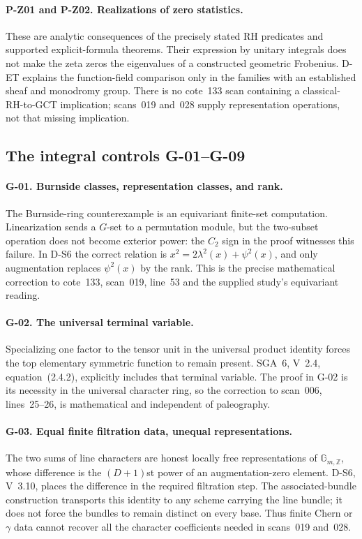 \paragraph{P-Z01 and P-Z02. Realizations of zero statistics.}
These are analytic consequences of the precisely stated RH predicates and supported explicit-formula theorems. Their expression by unitary integrals does not make the zeta zeros the eigenvalues of a constructed geometric Frobenius. D-ET explains the function-field comparison only in the families with an established sheaf and monodromy group. There is no cote~133 scan containing a classical-RH-to-GCT implication; scans~019 and~028 supply representation operations, not that missing implication.

\subsection{The integral controls G-01--G-09}

\paragraph{G-01. Burnside classes, representation classes, and rank.}
The Burnside-ring counterexample is an equivariant finite-set computation. Linearization sends a $G$-set to a permutation module, but the two-subset operation does not become exterior power: the $C_2$ sign in the proof witnesses this failure. In D-S6 the correct relation is $x^2=2\lambda^2(x)+\psi^2(x)$, and only augmentation replaces $\psi^2(x)$ by the rank. This is the precise mathematical correction to cote~133, scan~019, line~53 and the supplied study's equivariant reading.

\paragraph{G-02. The universal terminal variable.}
Specializing one factor to the tensor unit in the universal product identity forces the top elementary symmetric function to remain present. SGA~6, V~2.4, equation~(2.4.2), explicitly includes that terminal variable. The proof in G-02 is its necessity in the universal character ring, so the correction to scan~006, lines~25--26, is mathematical and independent of paleography.

\paragraph{G-03. Equal finite filtration data, unequal representations.}
The two sums of line characters are honest locally free representations of $\mathbb G_{m,\mathbb Z}$, whose difference is the $(D+1)$st power of an augmentation-zero element. D-S6, V~3.10, places the difference in the required filtration step. The associated-bundle construction transports this identity to any scheme carrying the line bundle; it does not force the bundles to remain distinct on every base. Thus finite Chern or $\gamma$ data cannot recover all the character coefficients needed in scans~019 and~028.

